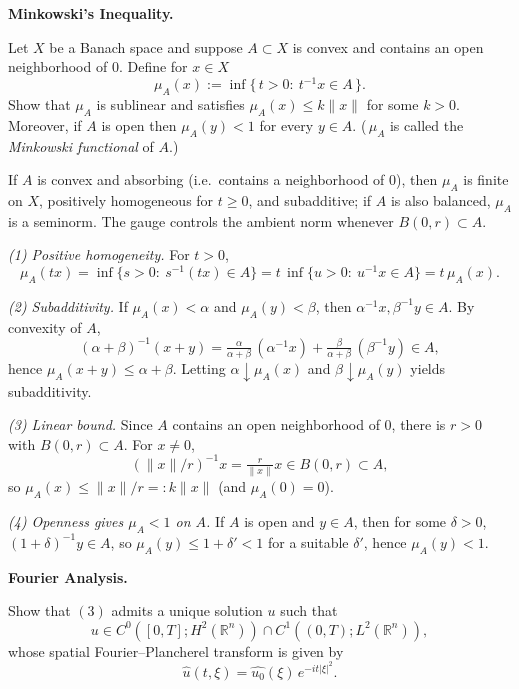 \begin{problem}[CP-II-0276]
\label{prob:cp-ii-0276}
\textbf{Minkowski's Inequality.}

\hspace*{1.5em}Let $X$ be a Banach space and suppose $A\subset X$ is convex and contains an open neighborhood of $0$.
	Define for $x\in X$
	\[
	\mu_A(x):=\inf\{\,t>0:\ t^{-1}x\in A\,\}.
	\]
	Show that $\mu_A$ is sublinear and satisfies $\mu_A(x)\le k\|x\|$ for some $k>0$.
	Moreover, if $A$ is open then $\mu_A(y)<1$ for every $y\in A$.
	(\,$\mu_A$ is called the \emph{Minkowski functional} of $A$.)

	If $A$ is convex and absorbing (i.e.\ contains a neighborhood of $0$), then $\mu_A$ is finite on $X$,
	positively homogeneous for $t\ge0$, and subadditive; if $A$ is also balanced, $\mu_A$ is a seminorm.
	The gauge controls the ambient norm whenever $B(0,r)\subset A$.
\end{problem}

\begin{solution}
\emph{(1) Positive homogeneity.}
	For $t>0$,
	\[
	\mu_A(tx)
	=\inf\{s>0:\ s^{-1}(tx)\in A\}
	=t\, \inf\{u>0:\ u^{-1}x\in A\}
	=t\,\mu_A(x).
	\]

	\noindent
	\emph{(2) Subadditivity.}
	If $\mu_A(x)<\alpha$ and $\mu_A(y)<\beta$, then $\alpha^{-1}x,\beta^{-1}y\in A$.
	By convexity of $A$,
	\[
	(\alpha+\beta)^{-1}(x+y)
	=\tfrac{\alpha}{\alpha+\beta}\,(\alpha^{-1}x)+\tfrac{\beta}{\alpha+\beta}\,(\beta^{-1}y)\in A,
	\]
	hence $\mu_A(x+y)\le \alpha+\beta$.
	Letting $\alpha\downarrow\mu_A(x)$ and $\beta\downarrow\mu_A(y)$ yields subadditivity.

	\noindent
	\emph{(3) Linear bound.}
	Since $A$ contains an open neighborhood of $0$, there is $r>0$ with $B(0,r)\subset A$.
	For $x\neq 0$,
	\[
	(\|x\|/r)^{-1}x = \tfrac{r}{\|x\|}x \in B(0,r)\subset A,
	\]
	so $\mu_A(x)\le \|x\|/r =: k\|x\|$ (and $\mu_A(0)=0$).

	\noindent
	\emph{(4) Openness gives $\mu_A<1$ on $A$.}
	If $A$ is open and $y\in A$, then for some $\delta>0$, $(1+\delta)^{-1}y\in A$, so
	$\mu_A(y)\le 1+\delta' <1$ for a suitable $\delta'$, hence $\mu_A(y)<1$.
\end{solution}

\begin{problem}[CP-II-0277]
\label{prob:cp-ii-0277}
\textbf{Fourier Analysis.}

\hspace*{1.5em}Show that \((3)\) admits a unique solution $u$ such that
	\[
	u \in C^0([0,T];H^2(\mathbb{R}^n)) \cap C^1((0,T);L^2(\mathbb{R}^n)),
	\]
	whose spatial Fourier--Plancherel transform is given by
	\[
	\widehat{u}(t,\xi) = \widehat{u_0}(\xi)\, e^{-it|\xi|^2}.
	\]
\end{problem}

